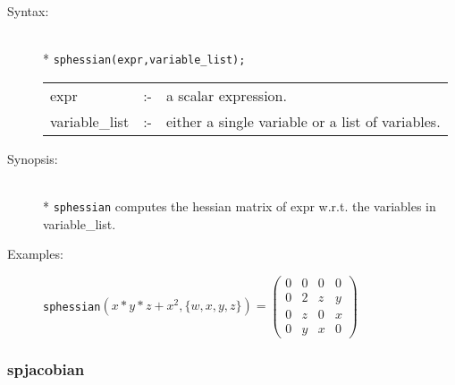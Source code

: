 \begin{description}
\item[Syntax:]\mbox{}\\*
 \texttt{sphessian(expr,variable\_list);}\\[2mm]
\begin{tabular}{l l l}
expr           &:-& a scalar expression. \\
variable\_list &:-& either a single variable or a list of variables.
\end{tabular}

\item[Synopsis:]\mbox{}\\*
                \texttt{sphessian} computes the hessian matrix of expr w.r.t.
                the variables in variable\_list.

\item[Examples:]
\begin{flushleft}
\hspace*{0.1in}
\texttt{sphessian}\((x*y*z+x^2,\{w,x,y,z\})  =
\begin{pmatrix} 0 & 0 & 0 & 0 \\ 0 & 2 & z & y \\ 0 & z & 0
& x \\ 0 & y & x & 0
\end{pmatrix}
\)
\end{flushleft}
\end{description}

\subsubsection{spjacobian}
\label{sparse:spjacobian}

